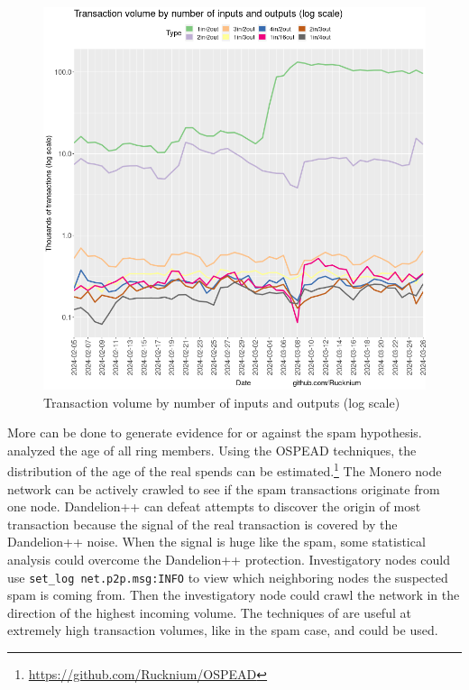 \documentclass[usletter,11pt,english,openany]{article}
\begin{document}
\begin{figure}[H]
\caption{Transaction volume by number of inputs and outputs (log scale)}
\label{fig-in-out-tx-type-volume}
\centering{}\includegraphics[scale=0.5]{images/in-out-tx-type-volume}
\end{figure}

More can be done to generate evidence for or against the spam hypothesis.
\cite{Krawiec-Thayer2021} analyzed the age of all ring members. Using
the OSPEAD techniques, the distribution of the age of the real spends
can be estimated.\footnote{\url{https://github.com/Rucknium/OSPEAD}}
The Monero node network can be actively crawled to see if the spam
transactions originate from one node. Dandelion++ can defeat attempts
to discover the origin of most transaction because the signal of the
real transaction is covered by the Dandelion++ noise. When the signal
is huge like the spam, some statistical analysis could overcome the
Dandelion++ protection. Investigatory nodes could use \texttt{set\_log
net.p2p.msg:INFO} to view which neighboring nodes the suspected spam
is coming from. Then the investigatory node could crawl the network
in the direction of the highest incoming volume. The techniques of
\cite{Sharma2022} are useful at extremely high transaction volumes,
like in the spam case, and could be used.



\end{document}
